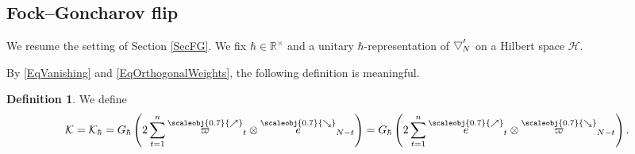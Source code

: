 \documentclass[11pt, reqno]{amsart}
\theoremstyle{definition}
\newtheorem{defn}[theorem]{Definition}
\numberwithin{equation}{section}
\def\Hc{\mathcal H}
\def\R{\mathbb R}
\newcommand{\Gauss}{G}
\newcommand{\Kc}{\mathcal{K}}
\newcommand{\nears}{\scaleobj{0.7}{\nearrow}}
\newcommand{\sears}{\scaleobj{0.7}{\searrow}}
\newcommand{\nee}{\overset{\nears}{e}}
\newcommand{\seee}{\overset{\sears}{e}}
\newcommand{\nevarpi}{\overset{\nears}{\varpi}}
\newcommand{\sevarpi}{\overset{\sears}{\varpi}}
\newcommand{\wbtd}[1]{\raisebox{\depth}{$\bigtriangledown'$\!\!}_{#1}}
\begin{document}

\subsection{Fock--Goncharov flip}

We resume the setting of Section \ref{SecFG}. We fix $\hbar\in \R^{\times}$ and a unitary $\hbar$-representation of $\wbtd{N}$ on a Hilbert space $\Hc$. 

By \eqref{EqVanishing} and \eqref{EqOrthogonalWeights}, the following definition is meaningful.

\begin{defn}
We define
\begin{equation}\label{EqGaussFG}
\Kc = \Kc_{\hbar} = \Gauss_{\hbar}\left(2\sum_{t=1}^n \nevarpi_t \otimes \seee_{N-t}\right) =  \Gauss_\hbar\left(2 \sum_{t=1}^n \nee_{t} \otimes \sevarpi_{N - t}\right). 
\end{equation}
\end{defn}
\end{document}
